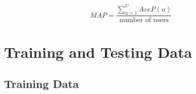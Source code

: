 \[
MAP = \frac{\sum_{u=1}^U AveP(u)}{\text{number of users}}
\]

\section{Training and Testing Data}

\subsection{Training Data}

